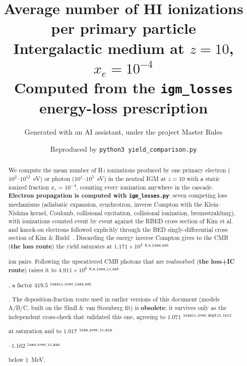\documentclass[11pt,a4paper]{article}
\title{Average number of HI ionizations per primary particle\\
\large Intergalactic medium at $z=10$, $x_e = 10^{-4}$\\
\large Computed from the \texttt{igm\_losses} energy-loss prescription}
\author{Generated with an AI assistant, under the project Master Rules}
\date{Reproduced by \texttt{python3 yield\_comparison.py}}
\newcommand{\ion}[2]{\textsc{#1\,\MakeLowercase{#2}}}
\newif\ifprovdraft
\newcommand{\src}[1]{%
  \ifprovdraft
    \ifmmode{}^{\text{\color{gray}\scriptsize\texttt{#1}}}%
    \else{\color{gray}\scriptsize$^{\texttt{#1}}$}%
    \fi
  \fi}
\begin{document}
\maketitle

\begin{abstract}
\noindent
We compute the mean number of \ion{H}{i} ionizations produced by one primary
electron ($10^{2}$--$10^{12}$~eV) or photon ($10^{1}$--$10^{5}$~eV) in the
neutral IGM at $z=10$ with a static ionized fraction $x_e = 10^{-4}$, counting
every ionization anywhere in the cascade. \textbf{Electron propagation is
computed with \texttt{igm\_losses.py}}: seven competing loss mechanisms
(adiabatic expansion, synchrotron, inverse Compton with the Klein--Nishina
kernel, Coulomb, collisional excitation, collisional ionization,
bremsstrahlung), with ionizations counted event by event against the RBED cross
section of Kim et al.~\cite{kim00} and knock-on electrons followed explicitly
through the BED singly-differential cross section of Kim \&
Rudd~\cite{kimrudd94}. Discarding the energy inverse Compton gives to the CMB
(\textbf{the loss route}) the yield saturates at
$1.171\times10^{4}$\src{N\_e\_loss\_sat} ion pairs. Following the upscattered CMB
photons that are reabsorbed (\textbf{the loss+IC route}) raises it to
$4.911\times10^{6}$\src{N\_e\_loss\_ic\_sat}, a factor
$419.5$\src{lossic\_over\_loss\_sat}. The deposition-fraction route used in earlier
versions of this document (models A/B/C, built on the Shull \& van Steenberg
fit) is \textbf{obsolete}; it survives only as the independent cross-check that
validated this one, agreeing to
$1.071$\src{lossic\_over\_depfit\_1e12} at saturation and to
$1.017$\src{loss\_over\_ic\_min}--$1.102$\src{loss\_over\_ic\_max} below 1~MeV.
\end{abstract}
\end{document}
